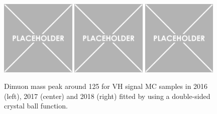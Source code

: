 \begin{figure}[h!]
    \centering
    \includegraphics[width=0.32\textwidth]{images_geofit/VH_mass_geofit_2016.png}
    \includegraphics[width=0.32\textwidth]{images_geofit/VH_mass_geofit_2017.png}
    \includegraphics[width=0.32\textwidth]{images_geofit/VH_mass_geofit_2018.png}
    \caption{Dimuon mass peak around 125 \gev for VH signal MC samples in 2016 (left), 2017 (center) and 2018 (right) fitted by using a double-sided crystal ball function.}
    \label{fig:dimu_mass_ttH}
\end{figure}


